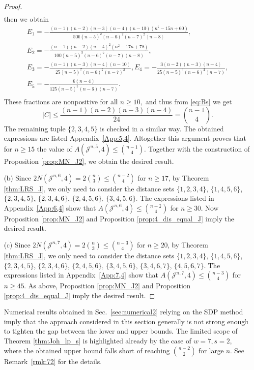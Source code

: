 \documentclass{amsart}
\newcommand{\cJ}{\mathcal{J}}
\begin{document}
\begin{proof}
\begin{gather*}
  \end{gather*} 
  then we obtain
\begin{gather*}
E_1=-\frac{(n-1)(n-2)(n-3)(n-4)(n-10)\left(n^2-15n+60\right)}{500(n-5)^2(n-6)^2(n-7)^2(n-8)},\\ E_2=-\frac{(n-1)(n-2)(n-4)^2\left(n^2-17n+78\right)}{100(n-5)^3(n-6)^2(n-7)(n-8)},\\ 
E_3=-\frac{(n-1)(n-3)(n-4)(n-10)}{25(n-5)^2(n-6)^2(n-7)^2},
E_4=-\frac{3(n-2)(n-3)(n-4)}{25(n-5)^3(n-6)^2(n-7)},\\
E_5=-\frac{6(n-4)}{125(n-5)^3(n-6)(n-7)}.\\
\end{gather*}
These fractions are nonpositive for all $n\ge 10,$ and thus from \eqref{eq:Bs} we get
  $$
  |C| \leq \frac{(n-1)(n-2)(n-3)(n-4)}{24} = \binom{n-1}{4}.
  $$
The remaining tuple $\{2, 3, 4, 5\}$ is checked in a similar way. The obtained expressions are listed Appendix~\ref{App:5,4}. Altogether
this argument proves that for $n\ge 15$ the value of $A(\cJ^{n, 5}, 4)\le \binom{n-1}{4}.$ Together with the construction of Proposition  \ref{prop:MN_J2}, we obtain the desired result.

(b) Since $2N(\cJ^{n, 6}, 4) = 2\binom{n}{3} \leq \binom{n-2}{4}$ for $n \geq 17$, by Theorem \ref{thm:LRS_J}, we only need to consider the distance sets $\{1, 2, 3, 4\}$, $\{1, 4, 5, 6\}$, $\{2, 3, 4, 5\}$, $\{2, 3, 4, 6\}$, $\{2, 4, 5, 6\}$, $\{3, 4, 5, 6\}$. The expressions listed in Appendix~\ref{App:6,4}
show that $A(\cJ^{n, 6}, 4)\le \binom{n-2}{4}$ for $n\ge 30$. Now Proposition  \ref{prop:MN_J2} and Proposition \ref{prop:4_dis_equal_J} imply the desired result.

(c) Since $2N(\cJ^{n, 7}, 4) = 2\binom{n}{3} \leq \binom{n-3}{4}$ for $n \geq 20$, by Theorem \ref{thm:LRS_J}, we only need to consider the distance sets $\{1, 2, 3, 4\}$, $\{1, 4, 5, 6\}$, $\{2, 3, 4, 5\}$, $\{2, 3, 4, 6\}$, $\{2, 4, 5, 6\}$, $\{3, 4, 5, 6\}$, $\{3, 4, 6, 7\}$, $\{4, 5, 6, 7\}$. The expressions listed in Appendix~\ref{App:7,4}
show that $A(\cJ^{n, 7}, 4)\le \binom{n-3}{4}$ for $n\ge 45$. As above, Proposition  \ref{prop:MN_J2} and Proposition \ref{prop:4_dis_equal_J} imply the desired result.
\end{proof}

Numerical results obtained in Sec.~\ref{sec:numerical2} relying on the SDP method imply that the approach
considered in this section generally is not strong enough to tighten the gap between the lower and upper bounds. 
The limited scope of Theorem \ref{thm:Joh_lp_s} is highlighted already by the case of $w=7,s=2,$ where the obtained
upper bound falls short of reaching $\binom{n-2}{2}$ for large $n$. See Remark~\ref{rmk:72} for the details.
\end{document}
